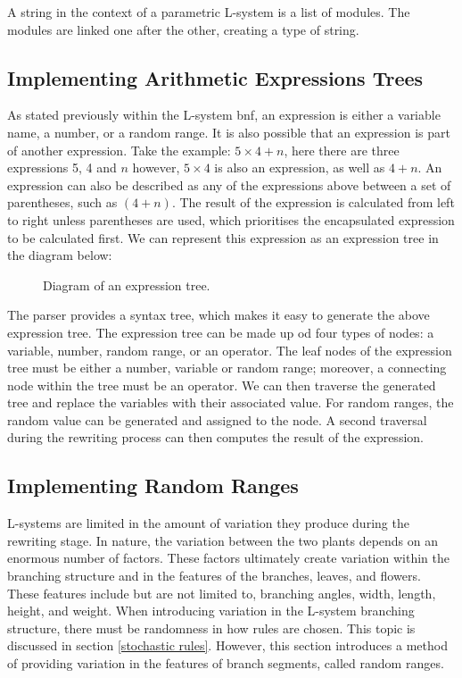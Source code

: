 A string in the context of a parametric L-system is a list of modules. The modules are linked one after the other, creating a type of string.

\subsection{Implementing Arithmetic Expressions Trees} \label{expression tree}

As stated previously within the L-system \acrshort{bnf}, an expression is either a variable name, a number, or a random range. It is also possible that an expression is part of another expression. Take the example: $5 \times 4 + n$, here there are three expressions 5, 4 and $n$ however, $5 \times 4$ is also an expression, as well as $4 + n$. An expression can also be described as any of the expressions above between a set of parentheses, such as $(4+n)$. The result of the expression is calculated from left to right unless parentheses are used, which prioritises the encapsulated expression to be calculated first. We can represent this expression as an expression tree in the diagram below:


\begin{figure}[htbp]
	{\centering
		\setlength{\fboxrule}{1pt}
		\vspace{7px}
		\caption{Diagram of an expression tree.} \label{3D rotations}
	}
\end{figure}
\FloatBarrier

\noindent
The parser provides a syntax tree, which makes it easy to generate the above expression tree. The expression tree can be made up od four types of nodes: a variable, number, random range, or an operator. The leaf nodes of the expression tree must be either a number, variable or random range; moreover, a connecting node within the tree must be an operator. We can then traverse the generated tree and replace the variables with their associated value. For random ranges, the random value can be generated and assigned to the node. A second traversal during the rewriting process can then computes the result of the expression.

\subsection{Implementing Random Ranges} \label{random range}

L-systems are limited in the amount of variation they produce during the rewriting stage. In nature, the variation between the two plants depends on an enormous number of factors. These factors ultimately create variation within the branching structure and in the features of the branches, leaves, and flowers. These features include but are not limited to, branching angles, width, length, height, and weight. When introducing variation in the L-system branching structure, there must be randomness in how rules are chosen. This topic is discussed in section \ref{stochastic rules}. However, this section introduces a method of providing variation in the features of branch segments, called random ranges.

